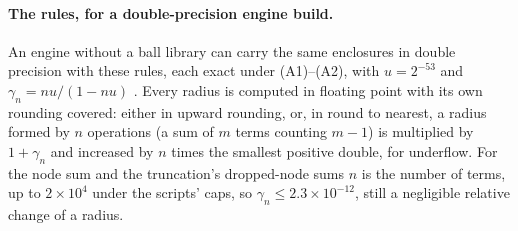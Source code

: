 \paragraph{The rules, for a double-precision engine build.} An engine without a ball library can carry the same
enclosures in double precision with these rules, each exact under (A1)--(A2), with $u=2^{-53}$ and
$\gamma_n=nu/(1-nu)$ \cite[Lemma~3.1]{higham}. Every radius is computed in floating point with its own rounding
covered: either in upward rounding, or, in round to nearest, a radius formed by $n$ operations (a sum of $m$ terms
counting $m-1$) is multiplied by $1+\gamma_n$ and increased by $n$ times the smallest positive double, for
underflow. For the node sum and the truncation's dropped-node sums $n$ is the number of terms, up to $2\times10^4$
under the scripts' caps, so $\gamma_n\le2.3\times10^{-12}$, still a negligible relative change of a radius.
